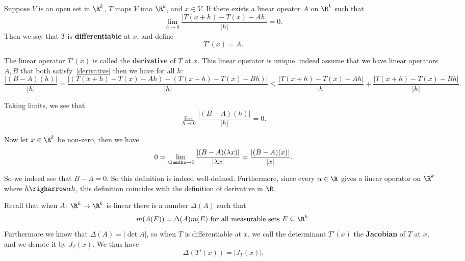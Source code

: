 \begin{definition}
    Suppose $V$ is an open set in $\R^k$, $T$ maps $V$ into $\R^k$, and $x\in V$. If there exists a linear opeator $A$ on $\R^k$ such that 
\begin{equation}\label{derivative}
    \lim_{h\rightarrow 0} \frac{|T(x+h)-T(x)-Ah|}{|h|} = 0.
\end{equation}
Then we say that $T$ is \textbf{differentiable} at $x$, and define \[
    T'(x) = A
.\]

The linear operator $T'(x)$ is called the \textbf{derivative} of $T$ at $x$. 
This linear operator is unique, indeed assume that we have linear operators $A,B$ that both satisfy~\ref{derivative} then we have for all $h$:  \[
    \frac{|(B-A)(h)|}{|h|} = \frac{|(T(x+h)-T(x)-Ah) - (T(x+h)-T(x)-Bh)|}{|h|} \leq \frac{|T(x+h)-T(x)-Ah|}{|h|} + \frac{|T(x+h)-T(x)-Bh|}{|h|}
.\]

Taking limits, we see that \[
    \lim_{h\rightarrow 0} \frac{|(B-A)(h)|}{|h|} = 0
.\]

Now let $x\in \R^k$ be non-zero, then we have  \[
    0 = \lim_{\lamdba\rightarrow 0} \frac{|(B-A)(\lambda x)|}{|\lambda x|} = \frac{|(B-A)(x)|}{|x|}
.\]

So we indeed see that $B-A = 0$. So this definition is indeed well-defined. 
Furthermore, since every $\alpha\in \R$ gives a linear operator on  $\R^k$ where $h\righarrow \alpha h$, this definition coincides with the definition of derivative in $\R$.
\end{definition}

\begin{definition}
Recall that when $A\colon \R^k\rightarrow \R^k$ is linear there is a number $\Delta(A)$ such that  \[
    m(A(E)) = \Delta(A)m(E) \ \text{for all measurable sets }E\subseteq \R^k
.\]
Furthermore we know that $\Delta(A) = |\det A|$, so when $T$ is differentiable at $x$, we call the determinant $T'(x)$ the \textbf{Jacobian} of $T$ at $x$, and we denote it by $J_T(x)$. We thus have  \[
    \Delta(T'(x)) = |J_T(x)|
.\]  
\end{definition}

